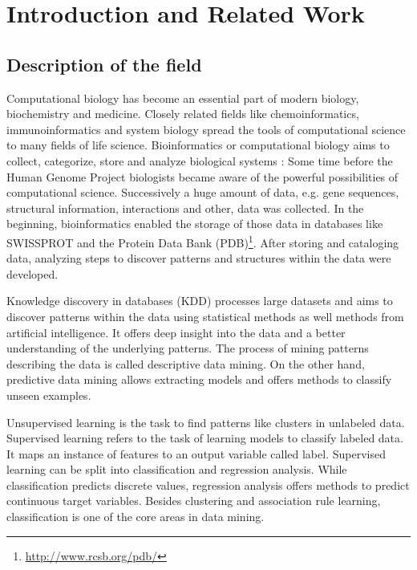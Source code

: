 \chapter{Introduction and Related Work}
\label{chapter:IntroductionAndRelatedWork}
	\section{Description of the field}
	\label{sec:description}
		Computational biology has become an essential part of modern biology, biochemistry and medicine. Closely related fields like chemoinformatics, immunoinformatics and system biology spread the tools of computational science to many fields of life science. Bioinformatics or computational biology aims to collect, categorize, store and analyze biological systems \cite{Luscombe01}: Some time before the Human Genome Project \cite{human01} biologists became aware of the powerful possibilities of computational science. Successively a huge amount of data, e.g. gene sequences, structural information, interactions and other, data was collected. In the beginning, bioinformatics enabled the storage of those data in databases like SWISSPROT \cite{Bairoch:1996} and the Protein Data Bank (PDB)\footnote{\url{http://www.rcsb.org/pdb/}}. After storing and cataloging data, analyzing steps to discover patterns and structures within the data \cite{Luscombe01} were developed.

		Knowledge discovery in databases (KDD) \cite{Fayyad96fromdata} processes large datasets and aims to discover patterns within the data using statistical methods as well methods from artificial intelligence. It offers deep insight into the data and a better understanding of the underlying  patterns. The process of mining patterns describing the data is called descriptive data mining. On the other hand, predictive data mining allows extracting models and offers methods to classify unseen examples.
		
		Unsupervised learning is the task to find patterns like clusters in unlabeled data. Supervised learning refers to the task of learning models to classify labeled data. It maps an instance of features to an output variable called label. Supervised learning can be split into classification and regression analysis. While classification predicts discrete values, regression analysis offers methods to predict continuous target variables. Besides clustering and association rule learning, classification is one of the core areas in data mining. 

